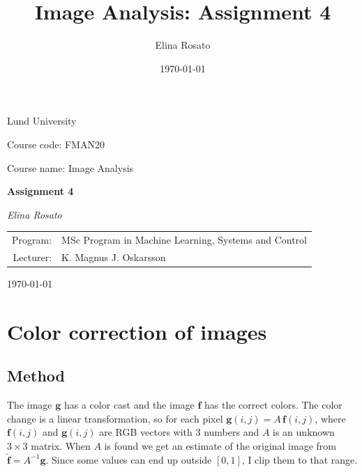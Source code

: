 \documentclass[11pt,a4paper]{article}
\title{Image Analysis: Assignment 4}
\author{Elina Rosato}
\date{\today}
\begin{document}
\begin{titlepage}
    \centering
    \vspace*{2cm}

    {\Large Lund University\par}

    \vspace{1.5cm}

    {\large Course code: FMAN20\par}
    {\large Course name: Image Analysis\par}

    \vspace{3cm}

    {\Huge\bfseries Assignment 4\par}

    \vspace{3cm}

    {\large\itshape Elina Rosato\par}

    \vspace{2cm}

    \begin{tabular}{rl}
        Program: & MSc Program in Machine Learning, Systems and Control \\[4pt]
        Lecturer: & K. Magnus J. Oskarsson
    \end{tabular}

    \vfill

    {\large \today\par}
\end{titlepage}

\section{Color correction of images}

\subsection{Method}

The image $\bm g$ has a color cast and the image $\bm f$ has the correct colors. The color change is a linear
transformation, so for each pixel $\bm g(i,j)=A\,\bm f(i,j)$, where $\bm f(i,j)$ and $\bm g(i,j)$ are RGB vectors
with 3 numbers and $A$ is an unknown $3\times3$ matrix. When $A$ is found we get an estimate of the
original image from $\hat{\bm f}=A^{-1}\bm g$. Since some values can end up outside $[0,1]$, I clip them to that range.
\end{document}
